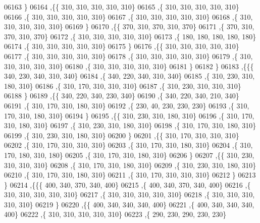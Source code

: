 \begin{DoxyCode}
06163     \}
06164    ,\{\{   310,   310,   310,   310,   310\}
06165     ,\{   310,   310,   310,   310,   310\}
06166     ,\{   310,   310,   310,   310,   310\}
06167     ,\{   310,   310,   310,   310,   310\}
06168     ,\{   310,   310,   310,   310,   310\}
06169     \}
06170    ,\{\{   370,   310,   370,   310,   370\}
06171     ,\{   370,   310,   370,   310,   370\}
06172     ,\{   310,   310,   310,   310,   310\}
06173     ,\{   180,   180,   180,   180,   180\}
06174     ,\{   310,   310,   310,   310,   310\}
06175     \}
06176    ,\{\{   310,   310,   310,   310,   310\}
06177     ,\{   310,   310,   310,   310,   310\}
06178     ,\{   310,   310,   310,   310,   310\}
06179     ,\{   310,   310,   310,   310,   310\}
06180     ,\{   310,   310,   310,   310,   310\}
06181     \}
06182    \}
06183   ,\{\{\{   340,   230,   340,   310,   340\}
06184     ,\{   340,   220,   340,   310,   340\}
06185     ,\{   310,   230,   310,   180,   310\}
06186     ,\{   310,   170,   310,   310,   310\}
06187     ,\{   310,   230,   310,   310,   310\}
06188     \}
06189    ,\{\{   340,   220,   340,   230,   340\}
06190     ,\{   340,   220,   340,   210,   340\}
06191     ,\{   310,   170,   310,   180,   310\}
06192     ,\{   230,    40,   230,   230,   230\}
06193     ,\{   310,   170,   310,   180,   310\}
06194     \}
06195    ,\{\{   310,   230,   310,   180,   310\}
06196     ,\{   310,   170,   310,   180,   310\}
06197     ,\{   310,   230,   310,   180,   310\}
06198     ,\{   310,   170,   310,   180,   310\}
06199     ,\{   310,   230,   310,   180,   310\}
06200     \}
06201    ,\{\{   310,   170,   310,   310,   310\}
06202     ,\{   310,   170,   310,   310,   310\}
06203     ,\{   310,   170,   310,   180,   310\}
06204     ,\{   310,   170,   180,   310,   180\}
06205     ,\{   310,   170,   310,   180,   310\}
06206     \}
06207    ,\{\{   310,   230,   310,   310,   310\}
06208     ,\{   310,   170,   310,   180,   310\}
06209     ,\{   310,   230,   310,   180,   310\}
06210     ,\{   310,   170,   310,   180,   310\}
06211     ,\{   310,   170,   310,   310,   310\}
06212     \}
06213    \}
06214   ,\{\{\{   400,   340,   370,   340,   400\}
06215     ,\{   400,   340,   370,   340,   400\}
06216     ,\{   310,   310,   310,   310,   310\}
06217     ,\{   310,   310,   310,   310,   310\}
06218     ,\{   310,   310,   310,   310,   310\}
06219     \}
06220    ,\{\{   400,   340,   340,   340,   400\}
06221     ,\{   400,   340,   340,   340,   400\}
06222     ,\{   310,   310,   310,   310,   310\}
06223     ,\{   290,   230,   290,   230,   230\}

\end{DoxyCode}
